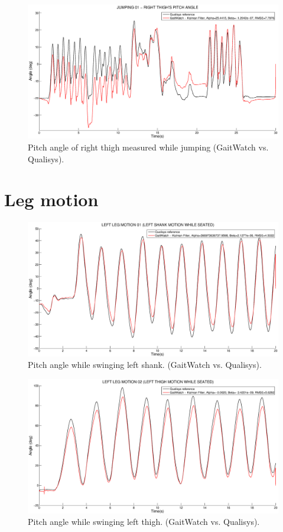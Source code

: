 \begin{figure}[H]
\centering
\includegraphics[width=1\textwidth]{figures/jumping_01_right_thigh.eps}
\caption{Pitch angle of right thigh measured while jumping (GaitWatch vs. Qualisys).}
\label{fig:jumping_right_thigh01}
\end{figure}

\section{Leg motion}

\begin{figure}[H]
\centering
\includegraphics[width=1\textwidth]{figures/Left_leg_motion_01_shank.eps}
\caption{Pitch angle while swinging left shank. (GaitWatch vs. Qualisys).}
\label{fig:Left_leg_motion_01_shank}
\end{figure}

\begin{figure}[H]
\centering
\includegraphics[width=1\textwidth]{figures/Left_leg_motion_02_thigh.eps}
\caption{Pitch angle while swinging left thigh. (GaitWatch vs. Qualisys).}
\label{fig:Left_leg_motion_02_thigh}
\end{figure}


